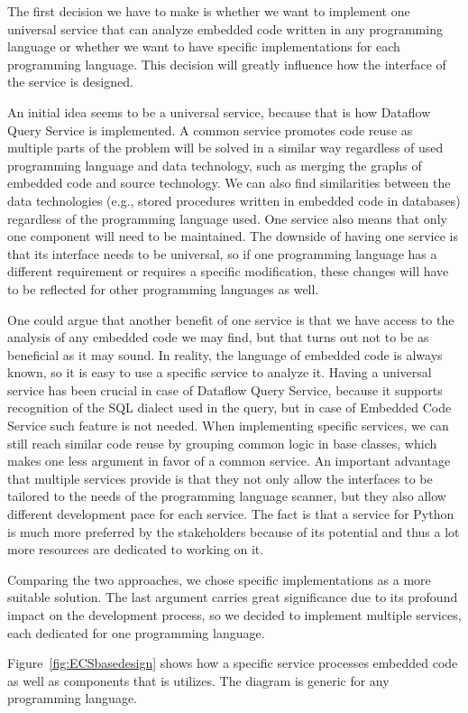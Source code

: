 The first decision we have to make is whether we want to implement one universal service that can analyze embedded code written in any programming language or whether we want to have specific implementations for each programming language. This decision will greatly influence how the interface of the service is designed.
\par
An initial idea seems to be a universal service, because that is how Dataflow Query Service is implemented. A common service promotes code reuse as multiple parts of the problem will be solved in a similar way regardless of used programming language and data technology, such as merging the graphs of embedded code and source technology. We can also find similarities between the data technologies (e.g., stored procedures written in embedded code in databases) regardless of the programming language used. One service also means that only one component will need to be maintained. The downside of having one service is that its interface needs to be universal, so if one programming language has a different requirement or requires a specific modification, these changes will have to be reflected for other programming languages as well.
\par
One could argue that another benefit of one service is that we have access to the analysis of any embedded code we may find, but that turns out not to be as beneficial as it may sound. In reality, the language of embedded code is always known, so it is easy to use a specific service to analyze it. Having a universal service has been crucial in case of Dataflow Query Service, because it supports recognition of the SQL dialect used in the query, but in case of Embedded Code Service such feature is not needed. When implementing specific services, we can still reach similar code reuse by grouping common logic in base classes, which makes one less argument in favor of a common service. An important advantage that multiple services provide is that they not only allow the interfaces to be tailored to the needs of the programming language scanner, but they also allow different development pace for each service. The fact is that a service for Python is much more preferred by the stakeholders because of its potential and thus a lot more resources are dedicated to working on it.
\par
Comparing the two approaches, we chose specific implementations as a more suitable solution.
The last argument carries great significance due to its profound impact on the development process, so we decided to implement multiple services, each dedicated for one programming language.  
\par
Figure~\ref{fig:ECSbasedesign} shows how a specific service processes embedded code as well as components that is utilizes. The diagram is generic for any programming language.

